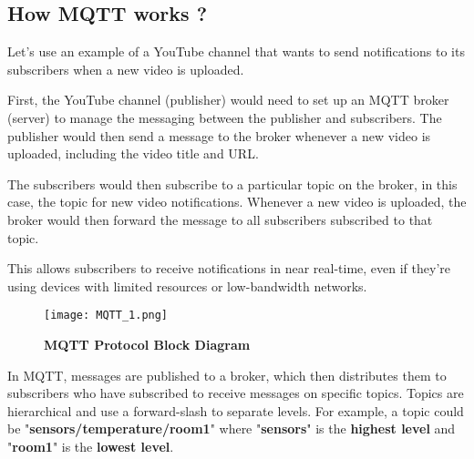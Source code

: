 \documentclass[12pt]{article}
\begin{document}
\subsection*{How MQTT works ?}
Let's use an example of a YouTube channel that wants to send notifications to its subscribers when a new video is uploaded.

First, the YouTube channel (publisher) would need to set up an MQTT broker (server) to manage the messaging between the publisher and subscribers. The publisher would then send a message to the broker whenever a new video is uploaded, including the video title and URL.

The subscribers would then subscribe to a particular topic on the broker, in this case, the topic for new video notifications. Whenever a new video is uploaded, the broker would then forward the message to all subscribers subscribed to that topic.

This allows subscribers to receive notifications in near real-time, even if they're using devices with limited resources or low-bandwidth networks.

 \begin{figure}[h]
\centering
\texttt{[image: MQTT\_1.png]}
\caption{\textbf{MQTT Protocol Block Diagram}}
\label{MQTT_block}
\end{figure}

In MQTT, messages are published to a broker, which then distributes them to subscribers who have subscribed to receive messages on specific topics. Topics are hierarchical and use a forward-slash  to separate levels. For example, a topic could be "\textbf{sensors/temperature/room1}" where "\textbf{sensors}" is the \textbf{highest level} and "\textbf{room1}" is the \textbf{lowest level}.
\end{document}

